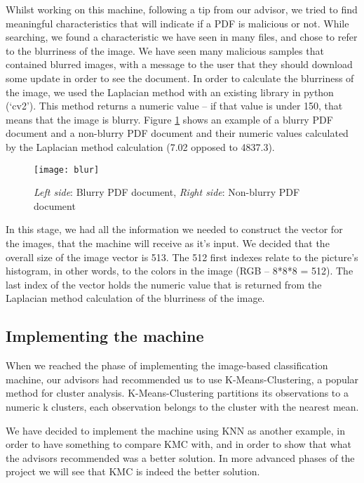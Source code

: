\documentclass{article}
\begin{document}
\indent Whilst working on this machine, following a tip from our advisor, we tried to find meaningful characteristics that will indicate if a PDF is malicious or not. While searching, we found a characteristic we have seen in many files, and chose to refer to the blurriness of the image. We have seen many malicious samples that contained blurred images, with a message to the user that they should download some update in order to see the document. In order to calculate the blurriness of the image, we used the Laplacian method with an existing library in python (‘cv2’). This method returns a numeric value – if that value is under 150, that means that the image is blurry. Figure \ref{fig:blur} shows an example of a blurry PDF document and a non-blurry PDF document and their numeric values calculated by the Laplacian method calculation (7.02 opposed to 4837.3).

\begin{figure}[h]
    \centering
    \texttt{[image: blur]}
    \\
    \caption{\textit{Left side}: Blurry PDF document, \textit{Right side}: Non-blurry PDF document}
    \label{fig:blur}
\end{figure}

\indent In this stage, we had all the information we needed to construct the vector for the images, that the machine will receive as it's input. We decided that the overall size of the image vector is 513. The 512 first indexes relate to the picture's histogram, in other words, to the colors in the image (RGB – 8*8*8 = 512). The last index of the vector holds the numeric value that is returned from the Laplacian method calculation of the blurriness of the image.

\subsection{Implementing the machine}
\indent When we reached the phase of implementing the image-based classification machine, our advisors had recommended us to use K-Means-Clustering, a popular method for cluster analysis. K-Means-Clustering partitions its observations to a numeric k clusters, each observation belongs to the cluster with the nearest mean.

\indent	We have decided to implement the machine using KNN as another example, in order to have something to compare KMC with, and in order to show that what the advisors recommended was a better solution. In more advanced phases of the project we will see that KMC is indeed the better solution.
\end{document}
